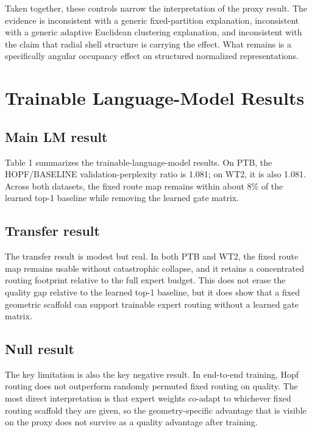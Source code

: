 \documentclass[10pt,twocolumn,letterpaper]{article}
\begin{document}
Taken together, these controls narrow the interpretation of the proxy result. The evidence is inconsistent with a generic fixed-partition explanation, inconsistent with a generic adaptive Euclidean clustering explanation, and inconsistent with the claim that radial shell structure is carrying the effect. What remains is a specifically angular occupancy effect on structured normalized representations.

\section{Trainable Language-Model Results}
\subsection{Main LM result}
Table 1 summarizes the trainable-language-model results. On PTB, the HOPF/BASELINE validation-perplexity ratio is 1.081; on WT2, it is also 1.081. Across both datasets, the fixed route map remains within about 8\% of the learned top-1 baseline while removing the learned gate matrix.

\begin{table}[t]
  \centering
  \caption{Main trainable language-model results.}
  \label{tab:lm-main}
  \small
  \resizebox{\columnwidth}{!}{}
\end{table}

\subsection{Transfer result}
The transfer result is modest but real. In both PTB and WT2, the fixed route map remains usable without catastrophic collapse, and it retains a concentrated routing footprint relative to the full expert budget. This does not erase the quality gap relative to the learned top-1 baseline, but it does show that a fixed geometric scaffold can support trainable expert routing without a learned gate matrix.

\subsection{Null result}
The key limitation is also the key negative result. In end-to-end training, Hopf routing does not outperform randomly permuted fixed routing on quality. The most direct interpretation is that expert weights co-adapt to whichever fixed routing scaffold they are given, so the geometry-specific advantage that is visible on the proxy does not survive as a quality advantage after training.
\end{document}

